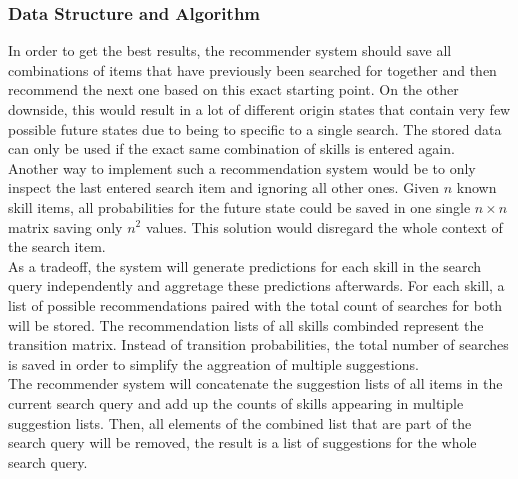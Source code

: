 \subsubsection{Data Structure and Algorithm}
In order to get the best results, the recommender system should save all combinations of items that have previously been searched for together and then recommend
the next one based on this exact starting point. On the other downside, this would result in a lot of different origin states that contain very few possible future states due to being to
specific to a single search. The stored data can only be used if the exact same combination of skills is entered again.\\
Another way to implement such a recommendation system would be to only inspect the last entered search item and ignoring all other ones. Given $n$ known skill items, all probabilities for the future state could be saved in one single $n \times n$ matrix saving only $n^2$ values.
This solution would disregard the whole context of the search item.\\
As a tradeoff, the system will generate predictions for each skill in the search query independently and aggretage these predictions afterwards. For each skill, a list of possible recommendations paired with the total count of searches for both will be stored. The recommendation lists of all skills combinded represent the transition matrix. Instead of transition probabilities, the total number of searches is saved in order to simplify the aggreation of multiple suggestions.\\
The recommender system will concatenate the suggestion lists of all items in the current search query and add up the counts of skills appearing in multiple suggestion lists. Then, all elements of the combined list that are part of the search query will be removed, the result is a list of suggestions for the whole search query.\\

\newpage
